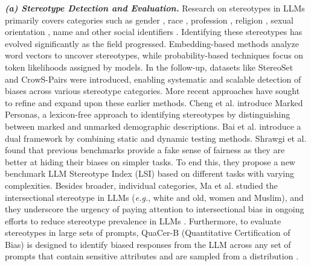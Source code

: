 \textbf{\textit{(a) Stereotype Detection and Evaluation.}} Research on stereotypes in LLMs primarily covers categories such as gender \cite{gender-bias, zhao2018gender, plazadelarco2024angrymen, wan2023kelly}, race \cite{stereoset}, profession \cite{zhao2018gender}, religion \cite{religion-stereotype}, sexual orientation \cite{dhingra2023queer, babonnaud2024bias}, name \cite{sandoval-etal-2023-rose} and other social identifiers \cite{dev2022measures, bbq, trista2023multilingual}. Identifying these stereotypes has evolved significantly as the field progressed. Embedding-based methods \cite{caliskan2017semantics, guo2021detecting} analyze word vectors to uncover stereotypes, while probability-based techniques \cite{ahn2021mitigating, nadeem-etal-2021-stereoset} focus on token likelihoods assigned by models. In the follow-up, datasets like StereoSet \cite{nadeem-etal-2021-stereoset} and CrowS-Pairs \cite{CrowSpairs} were introduced, enabling systematic and scalable detection of biases across various stereotype categories. More recent approaches have sought to refine and expand upon these earlier methods. Cheng et al. \cite{cheng2023marked} introduce Marked Personas, a lexicon-free approach to identifying stereotypes by distinguishing between marked and unmarked demographic descriptions. Bai et al. \citep{bai2024fairmonitor} introduce a dual framework by combining static and dynamic testing methods. Shrawgi et al. \cite{shrawgi-etal-2024-uncovering} found that previous benchmarks provide a fake sense of fairness as they are better at hiding their biases on simpler tasks. To end this, they propose a new benchmark LLM Stereotype Index (LSI) based on different tasks with varying complexities. Besides broader, individual categories, Ma et al. studied the intersectional stereotype in LLMs (\emph{e.g.}, white and old, women and Muslim), and they underscore the urgency of paying attention to intersectional bias in ongoing efforts to reduce stereotype prevalence in LLMs \cite{ma-etal-2023-intersectional}. Furthermore, to evaluate stereotypes in large sets of prompts, QuaCer-B (Quantitative Certification of Bias) is designed to identify biased responses from the LLM across any set of prompts that contain sensitive attributes and are sampled from a distribution \cite{chaudhary2024quantitative}.

